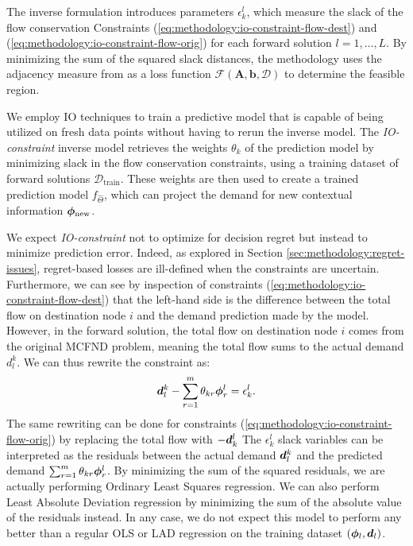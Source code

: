 The inverse formulation introduces parameters $\epsilon_k^l$, which measure the slack of the flow conservation Constraints (\ref{eq:methodology:io-constraint-flow-dest}) and (\ref{eq:methodology:io-constraint-flow-orig}) for each forward solution $l=1,\ldots, L$. By minimizing the sum of the squared slack distances, the methodology uses the adjacency measure from \cite{ghobadiInferringLinearFeasible2021} as a loss function $\mathcal{F}(\bm{A}, \bm{b}, \mathcal{D})$ to determine the feasible region. 

We employ IO techniques to train a predictive model that is capable of being utilized on fresh data points without having to rerun the inverse model. The \textit{IO-constraint} inverse model retrieves the weights $\theta_k$ of the prediction model by minimizing slack in the flow conservation constraints, using a training dataset of forward solutions $\mathcal{D}_\text{train}$. These weights are then used to create a trained prediction model $f_{\hat{\Theta}}$, which can project the demand for new contextual information ${\bm{\phi}}_\text{new}$. 

We expect \textit{IO-constraint} not to optimize for decision regret but instead to minimize prediction error. Indeed, as explored in Section \ref{sec:methodology:regret-issues}, regret-based losses are ill-defined when the constraints are uncertain.
Furthermore, we can see by inspection of constraints (\ref{eq:methodology:io-constraint-flow-dest}) that the left-hand side is the difference between the total flow on destination node $i$ and the demand prediction made by the model. However, in the forward solution, the total flow on destination node $i$ comes from the original MCFND problem, meaning the total flow sums to the actual demand $d^k_l$. We can thus rewrite the constraint as:
\begin{equation}
    {\bm{d}}_l^k - \sum_{r=1}^m \theta_{kr} {\bm{\phi}}^l_r = \epsilon^l_k.
\end{equation}
The same rewriting can be done for constraints (\ref{eq:methodology:io-constraint-flow-orig}) by replacing the total flow with $-{\bm{d}}^l_k$
The $\epsilon^l_k$ slack variables can be interpreted as the residuals between the actual demand ${\bm{d}}_l^k$ and the predicted demand $\sum_{r=1}^m \theta_{kr} {\bm{\phi}}^l_r$. By minimizing the sum of the squared residuals, we are actually performing Ordinary Least Squares regression. We can also perform Least Absolute Deviation regression by minimizing the sum of the absolute value of the residuals instead. In any case, we do not expect this model to perform any better than a regular OLS or LAD regression on the training dataset $({\bm{\phi}}_l, {\bm{d}}_l)$.

